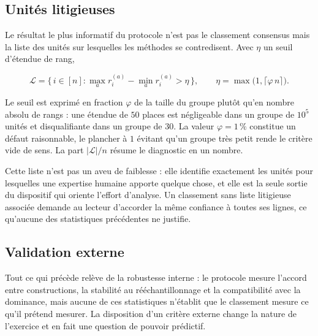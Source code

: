 \documentclass[11pt,a4paper]{article}
\theoremstyle{definition}
\theoremstyle{remark}
\newcommand{\abs}[1]{\left\lvert #1 \right\rvert}
\begin{document}
\bigskip

\subsection{Unités litigieuses}
\label{sec:litigieuses}

\medskip

Le résultat le plus informatif du protocole n'est pas le classement consensus mais la liste
des unités sur lesquelles les méthodes se contredisent. Avec $\eta$ un seuil d'étendue de
rang,

\medskip

\[
  \mathcal{L} = \Big\{\, i \in [n] :
    \max_{a} r^{(a)}_i - \min_{a} r^{(a)}_i > \eta \,\Big\},
  \qquad
  \eta = \max\big(1, \lceil \varphi\, n \rceil\big).
\]

\bigskip

Le seuil est exprimé en fraction $\varphi$ de la taille du groupe plutôt qu'en nombre absolu
de rangs : une étendue de $50$ places est négligeable dans un groupe de $10^5$ unités et
disqualifiante dans un groupe de $30$. La valeur $\varphi = 1\,\%$ constitue un défaut
raisonnable, le plancher à $1$ évitant qu'un groupe très petit rende le critère vide de
sens. La part $\abs{\mathcal{L}}/n$ résume le diagnostic en un nombre.

\medskip

Cette liste n'est pas un aveu de faiblesse : elle identifie exactement les unités pour
lesquelles une expertise humaine apporte quelque chose, et elle est la seule sortie du
dispositif qui oriente l'effort d'analyse. Un classement sans liste litigieuse associée
demande au lecteur d'accorder la même confiance à toutes ses lignes, ce qu'aucune des
statistiques précédentes ne justifie.

\bigskip

\subsection{Validation externe}
\label{sec:validation-externe}

\medskip

Tout ce qui précède relève de la robustesse interne : le protocole mesure l'accord entre
constructions, la stabilité au rééchantillonnage et la compatibilité avec la dominance,
mais aucune de ces statistiques n'établit que le classement mesure ce qu'il prétend
mesurer. La disposition d'un critère externe change la nature de l'exercice et en fait une
question de pouvoir prédictif.
\end{document}
